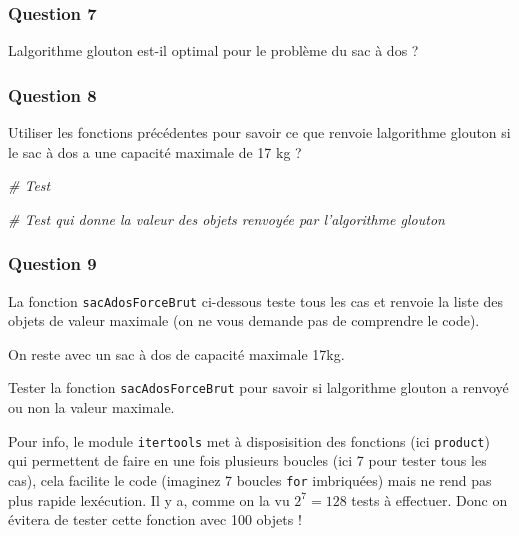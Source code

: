 \documentclass[
  paper=a4,
  ,captions=tableheading
]{scrartcl}
\newenvironment{Shaded}{}{}
\newcommand{\CommentTok}[1]{\textcolor[rgb]{0.38,0.63,0.69}{\textit{#1}}}
\begin{document}
\hypertarget{question-7}{%
\subsubsection{Question 7}\label{question-7}}

L\textquotesingle algorithme glouton est-il optimal pour le problème du
sac à dos ?

\hypertarget{question-8}{%
\subsubsection{Question 8}\label{question-8}}

Utiliser les fonctions précédentes pour savoir ce que renvoie
l\textquotesingle algorithme glouton si le sac à dos a une capacité
maximale de 17 kg ?

\begin{Shaded}
\begin{Highlighting}[]
\CommentTok{\# Test}
\end{Highlighting}
\end{Shaded}

\begin{Shaded}
\begin{Highlighting}[]
\CommentTok{\# Test qui donne la valeur des objets renvoyée par l’algorithme glouton}
\end{Highlighting}
\end{Shaded}

\hypertarget{question-9}{%
\subsubsection{Question 9}\label{question-9}}

La fonction \texttt{sacAdosForceBrut} ci-dessous teste tous les cas et
renvoie la liste des objets de valeur maximale (on ne vous demande pas
de comprendre le code).

On reste avec un sac à dos de capacité maximale 17kg.

Tester la fonction \texttt{sacAdosForceBrut} pour savoir si
l\textquotesingle algorithme glouton a renvoyé ou non la valeur
maximale.

Pour info, le module \texttt{itertools} met à disposisition des
fonctions (ici \texttt{product}) qui permettent de faire en une fois
plusieurs boucles (ici 7 pour tester tous les cas), cela facilite le
code (imaginez 7 boucles \texttt{for} imbriquées) mais ne rend pas plus
rapide l\textquotesingle exécution. Il y a, comme on l\textquotesingle a
vu \(2^7=128\) tests à effectuer. Donc on évitera de tester cette
fonction avec 100 objets !
\end{document}
